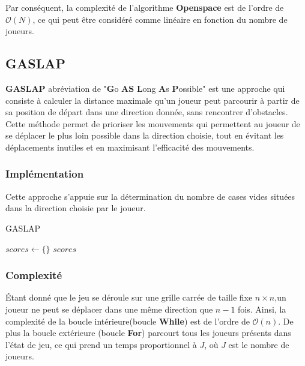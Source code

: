 Par conséquent, la complexité de l'algorithme \textbf{Openspace} est de l'ordre de $\mathcal{O}(N)$, 
ce qui peut être considéré comme linéaire en fonction du nombre de joueurs.\\

\subsection{GASLAP}
\textbf{GASLAP} abréviation de "\textbf{G}o \textbf{AS} \textbf{L}ong \textbf{A}s \textbf{P}ossible" est une approche 
qui consiste à calculer la distance maximale qu'un joueur peut parcourir à partir de sa position de départ dans une 
direction donnée, sans rencontrer d'obstacles. Cette méthode permet de prioriser les mouvements qui permettent au 
joueur de se déplacer le plus loin possible dans la direction choisie, tout en évitant les déplacements inutiles 
et en maximisant l'efficacité des mouvements.

\tocless\subsubsection{Implémentation}
Cette approche s'appuie sur la détermination du nombre de cases vides situées dans la direction choisie par le joueur.\\

\begin{algorithm}[H]
	\caption{GASLAP}
	\label{alg:gaslap}
	\DontPrintSemicolon
	$scores \gets \{\}$\;
	\Return $scores$\;
\end{algorithm}

\tocless\subsubsection{Complexité}
Étant donné que le jeu se déroule sur une grille carrée de taille fixe $n \times n$,un joueur ne peut se déplacer dans une même direction que
$n-1$ fois. Ainsi, la complexité de la boucle intérieure(boucle \textbf{While}) est de l'ordre de $\mathcal{O}(n)$. De plus la boucle extérieure
(boucle \textbf{For}) parcourt tous les joueurs présents dans l'état de jeu, ce qui prend un temps proportionnel à $J$, où $J$ est le nombre de joueurs.\\

